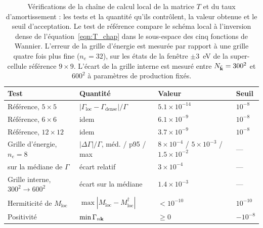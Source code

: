 \begin{table}[htbp]
    \centering
    \small
    \setlength{\tabcolsep}{4pt}
    \caption[Vérifications du schéma local.]{Vérifications de la chaîne
    de calcul local de la matrice $T$ et du taux d'amortissement : les tests et la quantité qu'ils contrôlent, la valeur obtenue et le seuil d'acceptation. Le test de
    référence compare le schéma local à l'inversion dense de
    l'équation~\eqref{eqn:T_chap} dans le sous-espace des cinq fonctions
    de Wannier. L'erreur de la grille d'énergie est mesurée par rapport à
    une grille quatre fois plus fine ($n_e = 32$), sur les états de la
    fenêtre $\pm3$~eV de la super-cellule référence $9\times9$. L'écart de la grille interne est mesuré entre $N_{\tilde{\mathbf{k}}}=300^2$ et $600^2$ à paramètres de production fixés.}
    \label{tab:tests_T}
    \begin{tabular}{l l l l}
        \hline\hline
        Test & Quantité & Valeur & Seuil \\
        \hline
        Référence, $5\times5$ & $|\Gamma_\text{loc}-\Gamma_\text{dense}|/\Gamma$ & $5.1\times10^{-14}$ & $10^{-8}$ \\
        Référence, $6\times6$ & idem & $6.1\times10^{-9}$ & $10^{-8}$ \\
        Référence, $12\times12$ & idem & $3.7\times10^{-9}$ & $10^{-8}$ \\
        Grille d'énergie, $n_e = 8$ & $|\Delta\Gamma|/\Gamma$, méd. / p95 / max & $8\times10^{-4}$ / $5\times10^{-3}$ / $1.5\times10^{-2}$ & --- \\
        \quad sur la médiane de $\Gamma$ & écart relatif & $3\times10^{-4}$ & --- \\
        Grille interne, $300^2\to600^2$ & écart sur la médiane & $1.4\times10^{-3}$ & --- \\
        Hermiticité de $M_\text{loc}$ & $\max|M_\text{loc}-M_\text{loc}^\dagger|$ & $<10^{-10}$ & $10^{-10}$ \\
        Positivité & $\min\Gamma_{n\mathbf{k}}$ & $\ge 0$ & $-10^{-8}$ \\
        \hline\hline
    \end{tabular}
\end{table}

\newpage
{}

